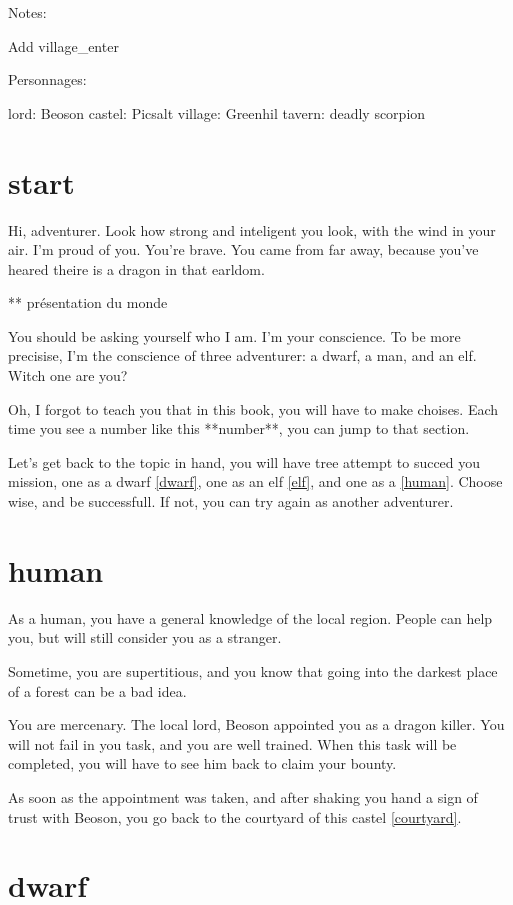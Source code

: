 Notes:

Add {village_enter}

Personnages:

lord: Beoson
castel: Picsalt
village: Greenhil
tavern: deadly scorpion

\section{start}

Hi, adventurer. Look how strong and inteligent you look, with the wind in your
air. I'm proud of you. You're brave. You came from far away, because you've
heared theire is a dragon in that earldom.

** présentation du monde

You should be asking yourself who I am. I'm your conscience. To be more
precisise, I'm the conscience of three adventurer: a dwarf, a man, and an elf.
Witch one are you?

Oh, I forgot to teach you that in this book, you will have to make choises. Each
time you see a number like this **number**, you can jump to that section.

Let's get back to the topic in hand, you will have tree attempt to succed you
mission, one as a dwarf \ref{dwarf}, one as an elf \ref{elf}, and one as a
\ref{human}. Choose wise, and be successfull. If not, you can try again as
another adventurer.

\section{human}

As a human, you have a general knowledge of the local region. People can help
you, but will still consider you as a stranger.

Sometime, you are supertitious, and you know that going into the darkest place
of a forest can be a bad idea.

You are mercenary. The local lord, Beoson appointed you as a dragon killer. You
will not fail in you task, and you are well trained. When this task will be
completed, you will have to see him back to claim your bounty.

As soon as the appointment was taken, and after shaking you hand a sign of trust
with Beoson, you go back to the courtyard of this castel \ref{courtyard}.

\section{dwarf}

